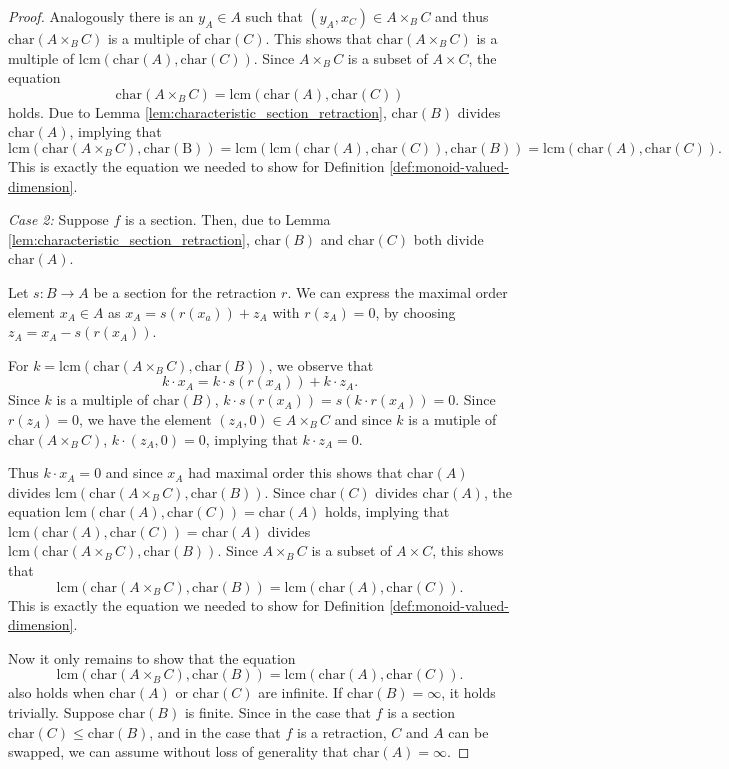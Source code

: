 \documentclass[10pt,a4paper]{amsart}
\newcommand{\lcm}{\mathrm{lcm}}
\begin{document}
\begin{proof}
    Analogously there is an $y_A \in A$ such that $(y_A, x_C) \in A \times_B C$ and thus $\mathrm{char}(A \times_B C)$ is a multiple of $\mathrm{char}(C)$. This shows that $\mathrm{char}(A \times_B C)$ is a multiple of $\lcm(\mathrm{char}(A), \mathrm{char}(C))$.
    Since $A \times_B C$ is a subset of $A \times C$, the equation
    $$
    \mathrm{char}(A \times_B C) = \lcm(\mathrm{char}(A), \mathrm{char}(C))
    $$
    holds. Due to Lemma \ref{lem:characteristic_section_retraction}, $\mathrm{char}(B)$ divides $\mathrm{char}(A)$, implying that
    $$
    \lcm(\mathrm{char}(A \times_B C), \mathrm{char(B)}) = \lcm( \lcm(\mathrm{char}(A), \mathrm{char}(C)),\mathrm{char}(B)) = \lcm(\mathrm{char}(A), \mathrm{char}(C)).
    $$
    This is exactly the equation we needed to show for Definition \ref{def:monoid-valued-dimension}.

    \textit{Case 2:} Suppose $f$ is a section. Then, due to Lemma \ref{lem:characteristic_section_retraction}, $\mathrm{char}(B)$ and $\mathrm{char}(C)$ both divide $\mathrm{char}(A)$. 
    
    Let $s: B \to A$ be a section for the retraction $r$. We can express the maximal order element $x_A \in A$ as $x_A = s(r(x_a))+ z_A$ with $r(z_A) = 0$, by choosing $z_A = x_A - s(r(x_A))$.

    For $k = \lcm(\mathrm{char}(A \times_B C), \mathrm{char}(B))$, we observe that 
    $$
    k \cdot x_A = k \cdot s(r(x_A)) + k \cdot z_A.
    $$
    Since $k$ is a multiple of $\mathrm{char}(B)$, $k \cdot s(r(x_A)) = s(k \cdot r(x_A)) = 0$. 
    Since $r(z_A) = 0$, we have the element $(z_A ,0) \in A \times_B C$ and since $k$ is a mutiple of $\mathrm{char}(A \times_B C)$, $k \cdot (z_A,0) = 0$, implying that $k \cdot z_A =0$.

    Thus $k \cdot x_A = 0$ and since $x_A$ had maximal order this shows that $\mathrm{char}(A)$ divides $\lcm(\mathrm{char}(A \times_B C), \mathrm{char}(B))$. Since $\mathrm{char}(C)$ divides $\mathrm{char}(A)$, the equation $\lcm(\mathrm{char}(A), \mathrm{char}(C)) = \mathrm{char}(A)$ holds, implying that $\lcm(\mathrm{char}(A), \mathrm{char}(C)) = \mathrm{char}(A)$ divides $\lcm(\mathrm{char}(A \times_B C), \mathrm{char}(B))$. Since $A \times_B C$ is a subset of $A \times C$, this shows that 
    $$
    \lcm(\mathrm{char}(A \times_B C), \mathrm{char}(B)) = \lcm(\mathrm{char}(A), \mathrm{char}(C)).
    $$
    This is exactly the equation we needed to show for Definition \ref{def:monoid-valued-dimension}.

    Now it only remains to show that the equation 
    $$
    \lcm(\mathrm{char}(A \times_B C), \mathrm{char}(B)) = \lcm(\mathrm{char}(A), \mathrm{char}(C)).
    $$
    also holds when $\mathrm{char}(A)$ or $\mathrm{char}(C)$ are infinite. If $\mathrm{char}(B)=\infty$, it holds trivially. Suppose $\mathrm{char}(B)$ is finite. Since in the case that $f$ is a section $\mathrm{char}(C) \leq \mathrm{char}(B)$, and in the case that $f$ is a retraction, $C$ and $A$ can be swapped, we can assume without loss of generality that $\mathrm{char}(A) = \infty$. 


\end{proof}
\end{document}
